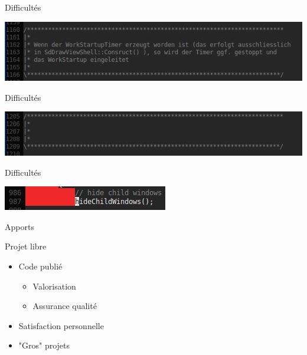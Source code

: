 \documentclass[handout]{beamer}
\begin{document}
\begin{frame}{Difficultés}
    \begin{center}
    \includegraphics[scale=0.5]{images/screenshot_037.png}
    \end{center}    
\end{frame}

\begin{frame}{Difficultés}
    \begin{center}
    \includegraphics[scale=0.5]{images/screenshot_038.png}
    \end{center}    
\end{frame}

\begin{frame}{Difficultés}
    \begin{center}
    \includegraphics[scale=0.5]{images/screenshot_039.png}
    \end{center}    
\end{frame}

\begin{frame}{Apports}
    \begin{block}{Projet libre}
        \begin{itemize}[<+->]
            \item Code publié
            \begin{itemize}[<+->]
                \item Valorisation
                \item Assurance qualité
            \end{itemize}
            \item Satisfaction personnelle
            \item "Gros" projets
        \end{itemize}
    \end{block}
\end{frame}
\end{document}
